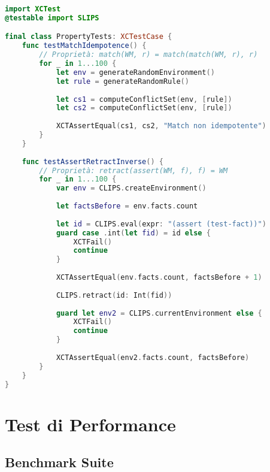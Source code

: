 \begin{lstlisting}[language=Swift]
import XCTest
@testable import SLIPS

final class PropertyTests: XCTestCase {
    func testMatchIdempotence() {
        // Proprietà: match(WM, r) = match(match(WM, r), r)
        for _ in 1...100 {
            let env = generateRandomEnvironment()
            let rule = generateRandomRule()
            
            let cs1 = computeConflictSet(env, [rule])
            let cs2 = computeConflictSet(env, [rule])
            
            XCTAssertEqual(cs1, cs2, "Match non idempotente")
        }
    }
    
    func testAssertRetractInverse() {
        // Proprietà: retract(assert(WM, f), f) = WM
        for _ in 1...100 {
            var env = CLIPS.createEnvironment()
            
            let factsBefore = env.facts.count
            
            let id = CLIPS.eval(expr: "(assert (test-fact))")
            guard case .int(let fid) = id else {
                XCTFail()
                continue
            }
            
            XCTAssertEqual(env.facts.count, factsBefore + 1)
            
            CLIPS.retract(id: Int(fid))
            
            guard let env2 = CLIPS.currentEnvironment else {
                XCTFail()
                continue
            }
            
            XCTAssertEqual(env2.facts.count, factsBefore)
        }
    }
}
\end{lstlisting}

\section{Test di Performance}

\subsection{Benchmark Suite}

